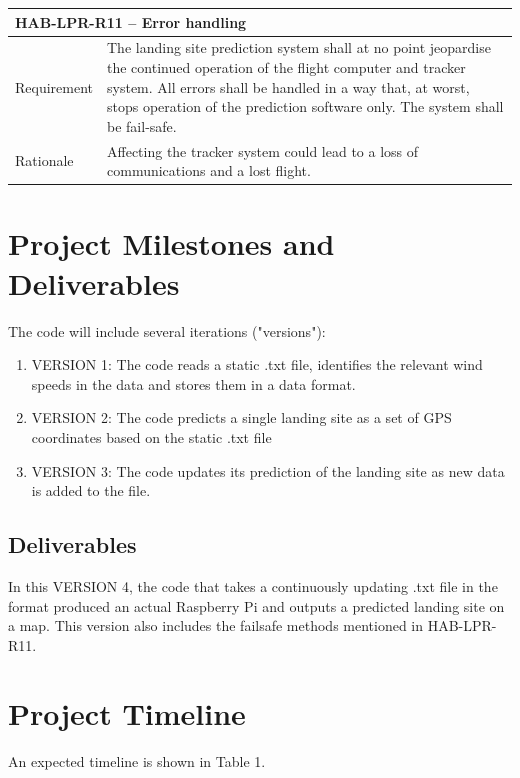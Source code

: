 \documentclass[11pt]{article}
\begin{document}
\begin{table}[!h] \centering
 \begin{tabular}{|p{2cm} p{11cm}|}
 \hline
  \multicolumn{2}{|l|}{HAB-LPR-R11 – Error handling} \\
  \hline
  Requirement & The landing site prediction system shall at no point jeopardise the continued operation of the flight computer and tracker system. All errors shall be handled in a way that, at worst, stops operation of the prediction software only. The system shall be fail-safe.  \\
  \hline
  Rationale & Affecting the tracker system could lead to a loss of communications and a lost flight.  \\
  \hline
 \end{tabular}
\end{table}

\section{Project Milestones and Deliverables}

The code will include several iterations ("versions"):

\begin{enumerate}
\item VERSION 1: The code reads a static .txt file, identifies the relevant wind speeds in the data and stores them in a data format. 
\item VERSION 2: The code predicts a single landing site as a set of GPS coordinates based on the static .txt file
\item VERSION 3: The code updates its prediction of the landing site as new data is added to the file.
\end{enumerate}


\subsection{Deliverables}
In this VERSION 4, the code that takes a continuously updating .txt file in the format produced an actual Raspberry Pi and outputs a predicted landing site on a map. This version also includes the failsafe methods mentioned in HAB-LPR-R11.

\section{Project Timeline}

An expected timeline is shown in Table 1.
\end{document}
